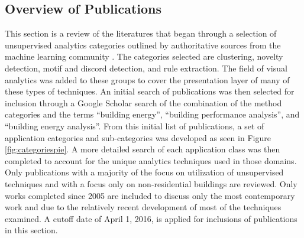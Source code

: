 \subsection{Overview of Publications}
\label{overviewofpubs}

This section is a review of the literatures that began through a selection of unsupervised analytics categories outlined by authoritative sources from the machine learning community \citep{hastie_elements_2009,james_introduction_2013,duda_pattern_2012,mirkin_clustering:_2012}. The categories selected are clustering, novelty detection, motif and discord detection, and rule extraction. The field of visual analytics was added to these groups to cover the presentation layer of many of these types of techniques. An initial search of publications was then selected for inclusion through a Google Scholar search of the combination of the method categories and the terms ``building energy'', ``building performance analysis'', and ``building energy analysis''. From this initial list of publications, a set of application categories and sub-categories was developed as seen in Figure \ref{fig:categoriespie}. A more detailed search of each application class was then completed to account for the unique analytics techniques used in those domains. Only publications with a majority of the focus on utilization of unsupervised techniques and with a focus only on non-residential buildings are reviewed. Only works completed since 2005 are included to discuss only the most contemporary work and due to the relatively recent development of most of the techniques examined. A cutoff date of April 1, 2016, is applied for inclusions of publications in this section.